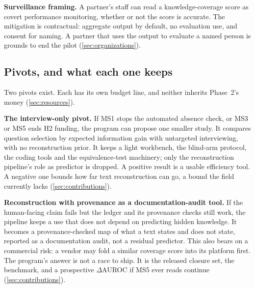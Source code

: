 \textbf{Surveillance framing.} A partner's staff can read a knowledge-coverage score as covert
performance monitoring, whether or not the score is accurate. The mitigation is contractual:
aggregate output by default, no evaluation use, and consent for naming. A partner that uses the
output to evaluate a named person is grounds to end the pilot (\cref{sec:organizations}).

\subsection{Pivots, and what each one keeps}

Two pivots exist. Each has its own budget line, and neither inherits Phase~2's money
(\cref{sec:resources}).

\textbf{The interview-only pivot.} If MS1 stops the automated absence check, or MS3 or MS5 ends
H2 funding, the program can propose one smaller study. It compares question selection by expected
information gain with untargeted interviewing, with no reconstruction prior. It keeps a light
workbench, the blind-arm protocol, the coding tools and the equivalence-test machinery; only the
reconstruction pipeline's role as predictor is dropped. A positive result is a usable efficiency
tool. A negative one bounds how far text reconstruction can go, a bound the field currently lacks
(\cref{sec:contributions}).

\textbf{Reconstruction with provenance as a documentation-audit tool.} If the human-facing claim
fails but the ledger and its provenance checks still work, the pipeline keeps a use that does not
depend on predicting hidden knowledge. It becomes a provenance-checked map of what a text states
and does not state, reported as a documentation audit, not a residual predictor. \evint{} This also
bears on a commercial risk: a vendor may fold a similar coverage score into its platform first.
The program's answer is not a race to ship. It is the released closure set, the benchmark, and a
prospective $\Delta$AUROC if MS5 ever reads continue (\cref{sec:contributions}).
